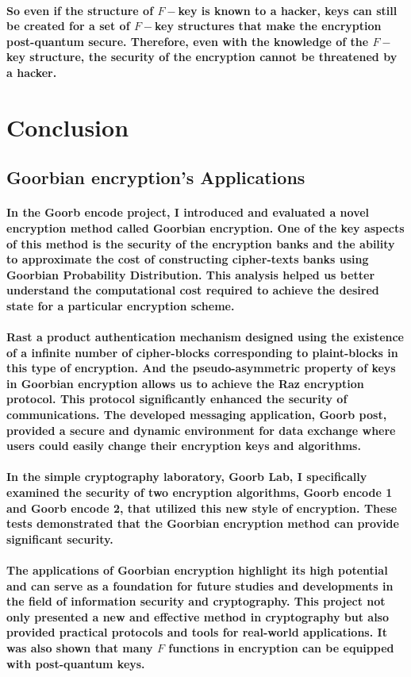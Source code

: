 \documentclass[oneside]{book}
\newcommand{\myparagraph}[1]{\paragraph{\textnormal{#1}}}
\begin{document}
\myparagraph{
So even if the structure of $F-$key is known to a hacker, keys can still be created for a set of $F-$key structures that make the encryption post-quantum secure. Therefore, even with the knowledge of the $F-$key structure, the security of the encryption cannot be threatened by a hacker.
}

\newpage

\section{Conclusion}

\subsection{Goorbian encryption's Applications}

\myparagraph{
In the \textbf{Goorb encode} project, I introduced and evaluated a novel encryption method called \textbf{Goorbian encryption}. One of the key aspects of this method is the security of the encryption banks and the ability to approximate the cost of constructing cipher-texts banks using \textbf{Goorbian Probability Distribution}. This analysis helped us better understand the computational cost required to achieve the desired state for a particular encryption scheme.
}

\myparagraph{
\textbf{Rast} a product authentication mechanism designed using the existence of a infinite number of cipher-blocks corresponding to plaint-blocks in this type of encryption. And the \textbf{pseudo-asymmetric} property of keys in \textbf{Goorbian encryption} allows us to achieve the \textbf{Raz} encryption protocol. This protocol significantly enhanced the security of communications. The developed messaging application, \textbf{Goorb post}, provided a secure and dynamic environment for data exchange where users could easily change their encryption keys and algorithms.
}

\myparagraph{
In the simple cryptography laboratory, \textbf{Goorb Lab}, I specifically examined the security of two encryption algorithms, \textbf{Goorb encode 1} and \textbf{Goorb encode 2}, that utilized this new style of encryption. These tests demonstrated that the \textbf{Goorbian encryption} method can provide significant security.
}

\myparagraph{
The applications of \textbf{Goorbian encryption} highlight its high potential and can serve as a foundation for future studies and developments in the field of information security and cryptography. This project not only presented a new and effective method in cryptography but also provided practical protocols and tools for real-world applications. It was also shown that many $F$ functions in encryption can be equipped with post-quantum keys.
}
\end{document}

